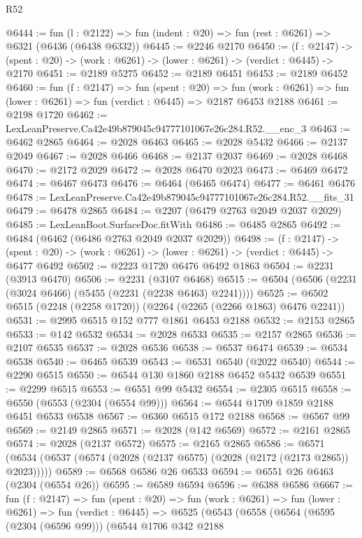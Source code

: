 \begin{lexlean}{R52}
\begin{coremodule}
@6444 := fun (l : @2122) => fun (indent : @20) => fun (rest : @6261) => @6321 (@6436 (@6438 @6332))
@6445 := @2246 @2170
@6450 := (f : @2147) ->
  (spent : @20) -> (work : @6261) -> (lower : @6261) -> (verdict : @6445) -> @2170
@6451 := @2189 @5275
@6452 := @2189 @6451
@6453 := @2189 @6452
@6460 := fun (f : @2147) =>
  fun (spent : @20) =>
  fun (work : @6261) => fun (lower : @6261) => fun (verdict : @6445) => @2187 @6453 @2188
@6461 := @2198 @1720
@6462 := LexLeanPreserve.Ca42e49b879045c94777101067e26c284.R52.__enc_3
@6463 := @6462 @2865
@6464 := @2028 @6463
@6465 := @2028 @5432
@6466 := @2137 @2049
@6467 := @2028 @6466
@6468 := @2137 @2037
@6469 := @2028 @6468
@6470 := @2172 @2029
@6472 := @2028 @6470 @2023
@6473 := @6469 @6472
@6474 := @6467 @6473
@6476 := @6464 (@6465 @6474)
@6477 := @6461 @6476
@6478 := LexLeanPreserve.Ca42e49b879045c94777101067e26c284.R52.__fits_31
@6479 := @6478 @2865
@6484 := @2207 (@6479 @2763 @2049 @2037 @2029)
@6485 := LexLeanBoot.SurfaceDoc.fitWith
@6486 := @6485 @2865
@6492 := @6484 (@6462 (@6486 @2763 @2049 @2037 @2029))
@6498 := (f : @2147) ->
  (spent : @20) -> (work : @6261) -> (lower : @6261) -> (verdict : @6445) -> @6477 @6492
@6502 := @2223 @1720 @6476 @6492 @1863
@6504 := @2231 (@3913 @6470)
@6506 := @2231 (@3107 @6468)
@6515 := @6504 (@6506 (@2231 (@3024 @6466) (@5455 (@2231 (@2238 @6463) @2241))))
@6525 := @6502 @6515 (@2248 (@2258 @1720)) (@2264 (@2265 (@2266 @1863) @6476 @2241))
@6531 := @2995 @6515 @152 @777 @1861 @6453 @2188
@6532 := @2153 @2865
@6533 := @142 @6532
@6534 := @2028 @6533
@6535 := @2157 @2865
@6536 := @2107 @6535
@6537 := @2028 @6536
@6538 := @6537 @6474
@6539 := @6534 @6538
@6540 := @6465 @6539
@6543 := @6531 @6540 (@2022 @6540)
@6544 := @2290 @6515
@6550 := @6544 @130 @1860 @2188 @6452 @5432 @6539
@6551 := @2299 @6515
@6553 := @6551 @99 @5432
@6554 := @2305 @6515
@6558 := @6550 (@6553 (@2304 (@6554 @99)))
@6564 := @6544 @1709 @1859 @2188 @6451 @6533 @6538
@6567 := @6360 @6515 @172 @2188
@6568 := @6567 @99
@6569 := @2149 @2865
@6571 := @2028 (@142 @6569)
@6572 := @2161 @2865
@6574 := @2028 (@2137 @6572)
@6575 := @2165 @2865
@6586 := @6571 (@6534 (@6537 (@6574 (@2028 (@2137 @6575) (@2028 (@2172 (@2173 @2865)) @2023)))))
@6589 := @6568 @6586 @26 @6533
@6594 := @6551 @26 @6463 (@2304 (@6554 @26))
@6595 := @6589 @6594
@6596 := @6388 @6586
@6667 := fun (f : @2147) =>
  fun (spent : @20) =>
  fun (work : @6261) =>
  fun (lower : @6261) =>
  fun (verdict : @6445) =>
  @6525
    (@6543
      (@6558
        (@6564
          (@6595 (@2304 (@6596 @99)))
          (@6544
            @1706
            @342
            @2188

\end{coremodule}
\end{lexlean}
